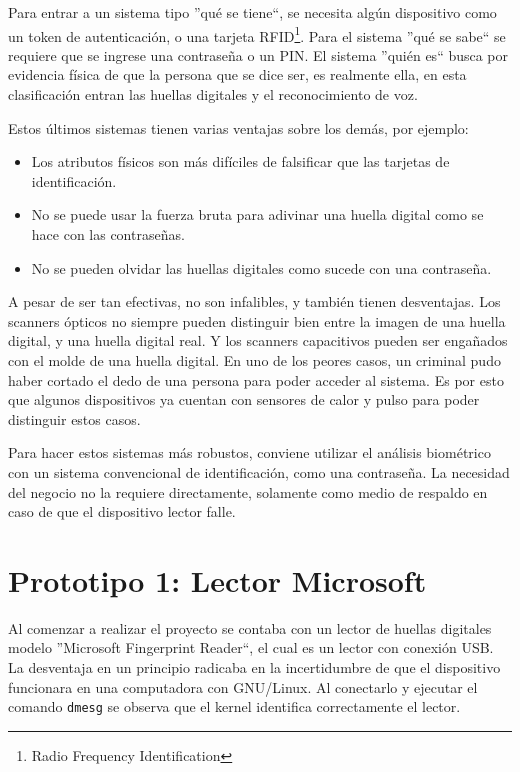 Para entrar a un sistema tipo ''qué se tiene``, se necesita algún dispositivo como un token de autenticación, o una tarjeta RFID\footnote{Radio Frequency Identification}. Para el sistema ''qué se sabe`` se requiere que se ingrese una contraseña o un PIN. El sistema ''quién es`` busca por evidencia física de que la persona que se dice ser, es realmente ella, en esta clasificación entran las huellas digitales y el reconocimiento de voz.

Estos últimos sistemas tienen varias ventajas sobre los demás, por ejemplo:

\begin{itemize}
 \item Los atributos físicos son más difíciles de falsificar que las tarjetas de identificación.
 \item No se puede usar la fuerza bruta para adivinar una huella digital como se hace con las contraseñas.
 \item No se pueden olvidar las huellas digitales como sucede con una contraseña.
\end{itemize}

A pesar de ser tan efectivas, no son infalibles, y también tienen desventajas. Los scanners ópticos no siempre pueden distinguir bien entre la imagen de una huella digital, y una huella digital real. Y los scanners capacitivos pueden ser engañados con el molde de una huella digital. En uno de los peores casos, un criminal pudo haber cortado el dedo de una persona para poder acceder al sistema. Es por esto que algunos dispositivos ya cuentan con sensores de calor y pulso para poder distinguir estos casos.

Para hacer estos sistemas más robustos, conviene utilizar el análisis biométrico con un sistema convencional de identificación, como una contraseña. La necesidad del negocio no la requiere directamente, solamente como medio de respaldo en caso de que el dispositivo lector falle.

\section{Prototipo 1: Lector Microsoft}
\label{sec:lector_microsoft}

Al comenzar a realizar el proyecto se contaba con un lector de huellas digitales modelo ''Microsoft Fingerprint Reader``, el cual es un lector con conexión USB. La desventaja en un principio radicaba en la incertidumbre de que el dispositivo funcionara en una computadora con GNU/Linux. Al conectarlo y ejecutar el comando \texttt{dmesg} se observa que el kernel identifica correctamente el lector.

